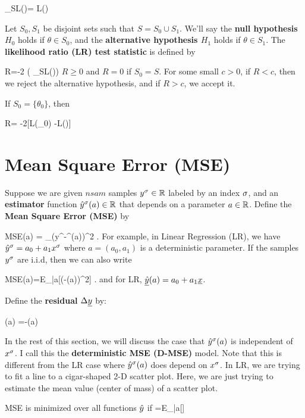\beq
\sup_{\theta\in S}L(\theta)=
L(\hat{\theta})
\eeq


Let $S_0, S_1$ be disjoint sets such that
 $S=S_0\cup S_1$.
We'll say
the {\bf null hypothesis $H_0$} holds
 if $\theta\in S_0$,
and the {\bf alternative hypothesis $H_1$}
holds if 
$\theta\in S_1$.
The {\bf likelihood ratio (LR) test statistic}
is defined by


\beq
R=-2\ln 
\left(
{\sup_{\theta\in S}L(\theta)}\right)
\eeq
$R\geq 0$ and $R=0$ if  $S_0=S$.
For some small $c>0$,  
if $R<c$, then we reject the alternative hypothesis, 
and if $R>c$, we accept it.




If $S_0=\{\theta_0\}$,
then

\beq
R= -2[\ln L(\theta_0) -\ln L(\hat{\theta})]
\eeq



\section{Mean Square Error (MSE)}

Suppose we are 
given $nsam$ samples $y^\sigma\in{ \mathbb{R}}$
labeled by an index $\sigma$,
and an {\bf estimator} function ${\hat{y}}^\sigma(a)\in{ \mathbb{R}}$ 
that depends on a parameter $a\in{ \mathbb{R}}$.
Define the {\bf Mean Square
Error (MSE)}
by

\beq
MSE(a) = \sum_\s (y^\s-\haty^\s(a))^2
\;.
\eeq
For example, in Linear Regression (LR),
we have ${\hat{y}}^\sigma= a_0 + a_1 x^\sigma$
where $a=(a_0, a_1)$ is a deterministic
parameter.
If the samples $y^\sigma$
are i.i.d, 
then we can also write


\beq 
MSE(a)=E_{|a}[(\rvy-\ul{\haty}(a))^2]
\;.
\eeq
and for LR, $\underline{{\hat{y}}}(a)=a_0+a_1{\underline{x}}$.

Define the {\bf residual} $\Delta{\underline{y}}$ by:


\beq
\Delta\rvy(a) =\rvy-\ul{\haty}(a)
\;\;\;
\eeq

In the rest of this section,
we will discuss the case that
${\hat{y}}^\sigma(a)$ is independent of $x^\sigma$.
I call
this the {\bf deterministic MSE (D-MSE)}
model.
Note that this
is different from the LR
case where
${\hat{y}}^\sigma(a)$ does depend on $x^\sigma$. 
In LR, we are trying
to fit 
a line to a cigar-shaped
2-D scatter plot.
Here, we are just trying
to estimate
the mean value (center of mass)
of a scatter plot.


\begin{claim}
MSE is minimized 
over all functions ${\hat{y}}$ if
\beq
\haty =E_{|a}[\rvy]
\eeq
\end{claim}
\proof

